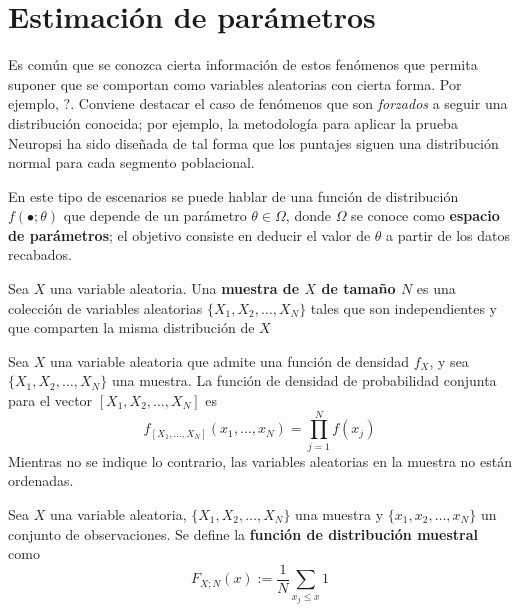 

\section{Estimación de parámetros}

Es común que se conozca cierta información de estos fenómenos que permita suponer que se comportan como variables aleatorias con cierta forma. Por ejemplo, ?.%
%
Conviene destacar el caso de fenómenos que son \textit{forzados} a seguir una distribución conocida; por ejemplo, la metodología para aplicar la prueba Neuropsi \cite{Ostrosky00} ha sido diseñada de tal forma que los puntajes siguen una distribución normal para cada segmento poblacional.

En este tipo de escenarios se puede hablar de una función de distribución $f(\bullet; \theta)$ que depende de un parámetro $\theta \in \Omega$, donde $\Omega$ se conoce como \textbf{espacio de parámetros}; el objetivo consiste en deducir el valor de $\theta$ a partir de los datos recabados.

\begin{definicion}
Sea $X$ una variable aleatoria. Una \textbf{muestra de $X$ de tamaño $N$} es una colección de variables aleatorias $\{ X_1, X_2, \dots, X_N \}$ tales que son independientes y que comparten la misma distribución de $X$
\end{definicion}

\begin{proposicion}
Sea $X$ una variable aleatoria que admite una función de densidad $f_X$, y sea $\{ X_1, X_2, \dots, X_N \}$ una muestra. La función de densidad de probabilidad conjunta para el vector $[ X_1, X_2, \dots, X_N ]$ es
\begin{equation}
f_{[ X_1, \dots, X_N ]}(x_1, \dots, x_N ) = \prod_{j=1}^{N} f(x_j)
\end{equation}
Mientras no se indique lo contrario, las variables aleatorias en la muestra no están ordenadas.
\end{proposicion}

\begin{proposicion}
Sea $X$ una variable aleatoria, $\{ X_1, X_2, \dots, X_N \}$ una muestra y $\{ x_1, x_2, \dots, x_N \}$ un conjunto de observaciones. Se define la \textbf{función de distribución muestral} como
\begin{equation}
F_{X; N} (x) := \frac{1}{N} \sum_{x_j \leq x } 1
\end{equation}
\end{proposicion}

